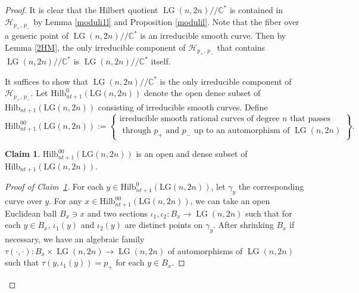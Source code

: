 \documentclass[10pt]{amsart}
\theoremstyle{definition}
\newtheorem{claim}[theorem]{Claim}
\newcommand{\LG}{\operatorname{LG}}
\theoremstyle{plain} %
\begin{document}
\begin{proof}
It is clear that the Hilbert quotient $\LG(n,2n)\! /\!/\mathbb C^*$ is contained in $\mathcal H_{p_+,\, p_-}$ by Lemma \ref{moduli1l} and Proposition \ref{modulil}. 
Note that the fiber over a generic point of $\LG(n,2n)\! /\!/\mathbb C^*$ is an irreducible smooth curve. Then by Lemma \ref{2HM},  the only irreducible component of $\mathcal H_{p_+,\, p_-}$ that contains $\LG(n,2n)\! /\!/\mathbb C^*$ is $\LG(n,2n)\! /\!/\mathbb C^*$ itself.




It suffices to show that  $\LG(n,2n)\! /\!/\mathbb C^*$ is 
the only irreducible component of $\mathcal H_{p_+,\, p_-}$.  Let
$\mathrm{Hilb}^0_{nt+1}(\mathrm{LG}(n,2n))$ denote the open dense subset of 
$\mathrm{Hilb}_{nt+1}(\mathrm{LG}(n,2n))$ consisting of irreducible smooth curves. Define
\begin{equation*}
\mathrm{Hilb}^{00}_{nt+1}(\mathrm{LG}(n,2n)):=\left\{\begin{matrix}
 \text {irreducible smooth rational curves of degree}\,\,n\,\,\text{that passes }\\
 \text{ through}\,\,p_+\,\,\text{and}\,\,p_-\,\,\text{up to an automorphism of}\,\,\LG(n,2n)   
\end{matrix}\right\}.  
\end{equation*}

\begin{claim}\label{verygeneral}
$\mathrm{Hilb}^{00}_{nt+1}(\mathrm{LG}(n,2n))$ is an open and dense subset of $\mathrm{Hilb}_{nt+1}(\mathrm{LG}(n,2n))$.   
\end{claim}
\begin{proof}[Proof of Claim~\ref{verygeneral}]
For each $y\in \mathrm{Hilb}^0_{nt+1}(\mathrm{LG}(n,2n))$, let $\gamma_y$ the corresponding curve over $y$.
For any $x\in\mathrm{Hilb}^{00}_{nt+1}(\mathrm{LG}(n,2n))$, we can take an open Euclidean ball $B_x\ni x$ and two sections $\iota_1,\iota_2\colon B_x\rightarrow\LG(n,2n)$ such that for each $y\in B_x$, $\iota_1(y)$ and $\iota_2(y)$ are distinct points on $\gamma_y$. After shrinking $B_x$ if necessary, we have an algebraic family $\tau(\cdot,\cdot)\colon B_x\times\LG(n,2n)\rightarrow\LG(n,2n)$ of automorphisms of $\LG(n,2n)$ such that 
$\tau(y,\iota_1(y))=p_+$ for each $y\in B_x$. 



\end{proof}
\end{proof}
\end{document}
